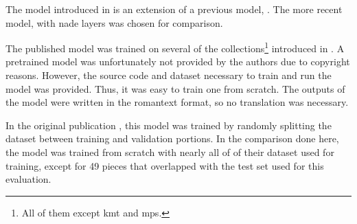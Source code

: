 
The model introduced in \textcite{micchi2021deep} is an
extension of a previous model, \textcite{micchi2020not}. The
more recent model, with \gls{nade} layers was chosen for
comparison.

The published model was trained on several of the
collections\footnote{All of them except \gls{kmt} and
\gls{mps}.} introduced in
. A pretrained model
was unfortunately not provided by the authors due to
copyright reasons. However, the source code and dataset
necessary to train and run the model was provided. Thus, it
was easy to train one from scratch. The outputs of the model
were written in the \gls{romantext} format, so no
translation was necessary. 

In the original publication \parencite{micchi2021deep}, this
model was trained by randomly splitting the dataset between
training and validation portions. In the comparison done
here, the model was trained from scratch with nearly all of
of their dataset used for training, except for 49 pieces
that overlapped with the test set used for this evaluation.
